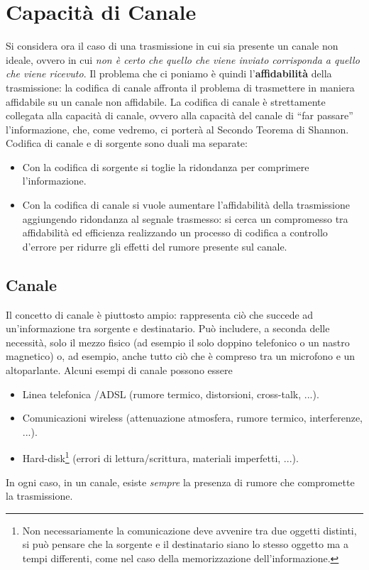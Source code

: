 \section{Capacit\`a di Canale} \label{sec:can}
Si considera ora il caso di una trasmissione in cui sia presente un canale non ideale, ovvero in cui \textit{non è certo che quello che viene inviato corrisponda a quello che viene ricevuto}. Il problema che ci poniamo è quindi l’\textbf{affidabilità} della trasmissione: la codifica di canale affronta il problema di trasmettere in maniera affidabile su un canale non affidabile. La codifica di canale è strettamente collegata alla capacit\`a di canale, ovvero alla capacità del canale di “far passare” l’informazione, che, come vedremo, ci porter\`a al Secondo Teorema di Shannon. Codifica di canale e di sorgente sono duali ma separate:
\begin{itemize}
    \item Con la codifica di sorgente si toglie la ridondanza per comprimere l’informazione.
    \item Con la codifica di canale si vuole aumentare l’affidabilità della trasmissione aggiungendo ridondanza al segnale trasmesso: si cerca un compromesso tra affidabilità ed efficienza realizzando un processo di codifica a controllo d’errore per ridurre gli effetti del rumore presente sul canale.
\end{itemize}
\subsection{Canale}
Il concetto di canale è piuttosto ampio: rappresenta ciò che succede ad un’informazione tra sorgente e
destinatario. Può includere, a seconda delle necessità, solo il mezzo fisico (ad esempio il solo doppino telefonico o un nastro magnetico) o, ad esempio, anche tutto ciò che è compreso tra un microfono e un altoparlante. Alcuni esempi di canale possono essere
\begin{itemize}
    \item Linea telefonica /ADSL (rumore termico, distorsioni, cross-talk, ...).
    \item Comunicazioni wireless (attenuazione atmosfera, rumore termico, interferenze, ...).
    \item Hard-disk\footnote{Non necessariamente la comunicazione deve avvenire tra due oggetti distinti, si pu\`o pensare che la sorgente e il destinatario siano lo stesso oggetto ma a tempi differenti, come nel caso della memorizzazione dell'informazione.} (errori di lettura/scrittura, materiali imperfetti, ...).
\end{itemize}
In ogni caso, in un canale, esiste \textit{sempre} la presenza di rumore che compromette la trasmissione.
